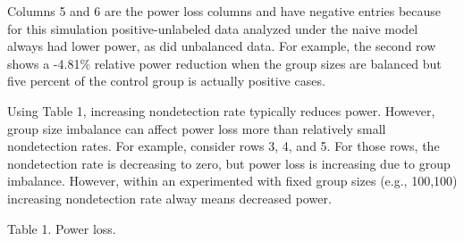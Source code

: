 \documentclass[
]{article}
\begin{document}
Columns 5 and 6 are the power loss columns and have negative entries
because for this simulation positive-unlabeled data analyzed under the
naive model always had lower power, as did unbalanced data. For example,
the second row shows a -4.81\% relative power reduction when the group
sizes are balanced but five percent of the control group is actually
positive cases.

Using Table 1, increasing nondetection rate typically reduces power.
However, group size imbalance can affect power loss more than relatively
small nondetection rates. For example, consider rows 3, 4, and 5. For
those rows, the nondetection rate is decreasing to zero, but power loss
is increasing due to group imbalance. However, within an experimented
with fixed group sizes (e.g., 100,100) increasing nondetection rate
alway means decreased power.

Table 1. Power loss.
\end{document}
